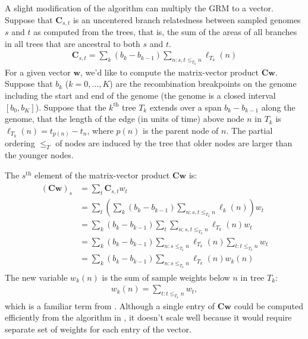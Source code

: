 A slight modification of the algorithm can multiply the GRM to a vector.
%
Suppose that $\mathbf{C}_{s,t}$ is an uncentered branch relatedness between
sampled genomes $s$ and $t$ as computed from the trees, that is,
the sum of the areas of all branches in all trees that are ancestral to both $s$ and $t$.
%
\begin{align} \label{defn:pairwise_relatedness}
    \mathbf{C}_{s,t} = \sum_k (b_k - b_{k-1}) \sum_{n: s,t \le_{T_k} n} \ell_{T_k}(n) %
\end{align}
%
For a given vector $\mathbf{w}$, we'd like to compute the matrix-vector product $\mathbf{C}\mathbf{w}$.
%
Suppose that $b_k$ ($k=0,\ldots,K$) are the recombination breakpoints on the genome
including the start and end of the genome (the genome is a closed interval $[b_0, b_K]$).
%
Suppose that the $k^{\text{th}}$ tree $T_k$ extends over a span $b_k - b_{k-1}$ along the genome,
that the length of the edge (in units of time) above node $n$ in $T_k$ is $\ell_{T_k}(n) = t_{p(n)}-t_n$,
where $p(n)$ is the parent node of $n$.
%
The partial ordering $\le_T$ of nodes are induced by the tree that older nodes are larger than the younger nodes.

The $s^{\text{th}}$ element of the matrix-vector product $\mathbf{C}\mathbf{w}$ is:
%
\begin{align} \label{eq:similar_ralph2020}
    \begin{aligned}
        (\mathbf{C}\mathbf{w})_s &=
        \sum_t \mathbf{C}_{s,t} w_t \\
        &=
        \sum_t
        \left(
            \sum_k (b_k - b_{k-1}) \sum_{n: s,t \le_{T_k} n} \ell_k(n)
        \right) {w}_t \\
        &=
        \sum_k (b_k - b_{k-1})
        \sum_t
        \sum_{n: s,t \le_{T_k} n} \ell_{T_k}(n) {w}_t \\
        &=
        \sum_k (b_k - b_{k-1})
        \sum_{n: s\le_{T_k} n} \ell_{T_k}(n)
        \sum_{t:t \le_{T_k} n} {w}_t \\
        &=
        \sum_k (b_k - b_{k-1})
        \sum_{n: s\le_{T_k} n} \ell_{T_k}(n) w_k(n)
    \end{aligned}
\end{align}
%
The new variable $w_k(n)$ is the sum of sample weights below $n$ in tree $T_k$:
%
\begin{align}
    w_k(n) = \sum_{t:t \le_{T_k} n} {w}_t ,
\end{align}
%
which is a familiar term from \citet{ralph2020efficiently}.
%
Although a single entry of $\mathbf{C}\mathbf{w}$ could be computed efficiently
from the algorithm in \citet{ralph2020efficiently},
it doesn't scale well because it would require separate set of weights for each entry of the vector.

